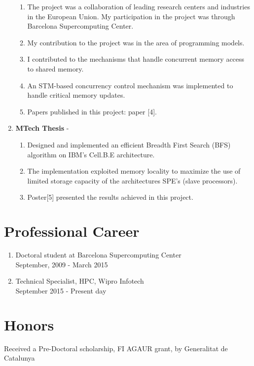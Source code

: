\documentclass[margin]{res}
\begin{document}
\begin{resume}
\begin{enumerate}
\begin{enumerate}
				    \item The project was a collaboration of leading research centers and industries in the European Union. My participation in the project was through Barcelona Supercomputing Center.
				    \item My contribution to the project was in the area of programming models. 
				    \item I contributed to the mechanisms that handle concurrent memory access to shared memory.
				    \item An STM-based concurrency control mechanism was implemented to handle critical memory updates.
				    \item Papers published in this project: paper [4].
			\end{enumerate}
	     	
%
	   \item {\bf MTech Thesis} -
			 \begin{enumerate}
				    \item Designed and implemented an efficient Breadth First Search (BFS) algorithm on IBM's Cell.B.E architecture.
				    \item The implementation exploited memory locality to maximize the use of limited storage capacity of the architectures SPE's (slave processors). 
				    \item Poster[5] presented the results achieved in this project.
			 \end{enumerate}
	\end{enumerate}
%
	\section{Professional Career}
%
	\begin{enumerate}
		   \item Doctoral student at Barcelona Supercomputing Center \\ 
				 September, 2009 - March 2015
		   \item Technical Specialist, HPC, Wipro Infotech \\
				 September 2015 - Present day
	\end{enumerate}
%
	\section{Honors} 
	Received a Pre-Doctoral scholarship, FI AGAUR grant,  by Generalitat de Catalunya
	
	

\end{resume}
\end{document}
